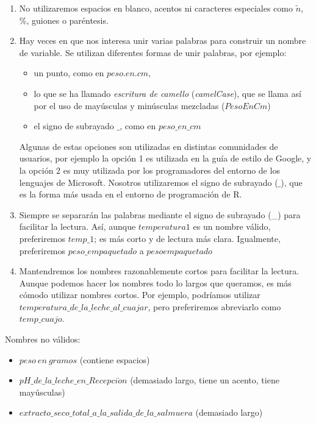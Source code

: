 \documentclass[
  letterpaper,
  DIV=11,
  numbers=noendperiod,
  oneside]{scrreprt}
\providecommand{\tightlist}{%
  \setlength{\itemsep}{0pt}\setlength{\parskip}{0pt}}\usepackage{longtable,booktabs,array}
\begin{document}
\begin{enumerate}
\def\labelenumi{\arabic{enumi}.}
\setcounter{enumi}{3}
\item
  No utilizaremos espacios en blanco, acentos ni caracteres especiales
  como \(\tilde{n}\), \(\%\), guiones o paréntesis.
\item
  Hay veces en que nos interesa unir varias palabras para construir un
  nombre de variable. Se utilizan diferentes formas de unir palabras,
  por ejemplo:

  \begin{itemize}
  \item
    un punto, como en \(peso.en.cm\),
  \item
    lo que se ha llamado \emph{escritura de camello} (\emph{camelCase}),
    que se llama así por el uso de mayúsculas y minúsculas mezcladas
    (\(PesoEnCm\))
  \item
    el signo de subrayado \(\_\), como en \(peso\_en\_cm\)
  \end{itemize}

  Algunas de estas opciones son utilizadas en distintas comunidades de
  usuarios, por ejemplo la opción 1 es utilizada en la guía de estilo de
  Google, y la opción 2 es muy utilizada por los programadores del
  entorno de los lenguajes de Microsoft. Nosotros utilizaremos el signo
  de subrayado (\(\_\)), que es la forma más usada en el entorno de
  programación de R.
\item
  Siempre se separarán las palabras mediante el signo de subrayado (\_)
  para facilitar la lectura. Así, aunque \(temperatura1\) es un nombre
  válido, preferiremos \(temp\_1\); es más corto y de lectura más clara.
  Igualmente, preferiremos \(peso\_empaquetado\) a \(pesoempaquetado\)
\item
  Mantendremos los nombres razonablemente cortos para facilitar la
  lectura. Aunque podemos hacer los nombres todo lo largos que queramos,
  es más cómodo utilizar nombres cortos. Por ejemplo, podríamos utilizar
  \(temperatura\_de\_la\_leche\_al\_cuajar\), pero preferiremos
  abreviarlo como \(temp\_cuajo\).
\end{enumerate}

Nombres no válidos:

\begin{itemize}
\tightlist
\item
  \(peso\ en\ gramos\) (contiene espacios)
\item
  \(pH\_de\_la\_leche\_en\_Recepci\acute{o}n\) (demasiado largo, tiene
  un acento, tiene mayúsculas)
\item
  \(extracto\_seco\_total\_a\_la\_salida\_de\_la\_salmuera\) (demasiado
  largo)
\end{itemize}
\end{document}
